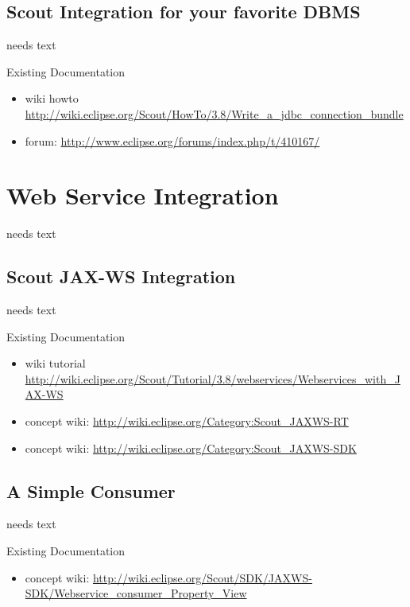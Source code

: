 \documentclass[a4paper,10pt,twoside]{book}
\begin{document}
\section{Scout Integration for your favorite DBMS}
needs text

\noindent Existing Documentation
\begin{itemize}
  \item wiki howto \url{http://wiki.eclipse.org/Scout/HowTo/3.8/Write_a_jdbc_connection_bundle}
  \item forum: \url{http://www.eclipse.org/forums/index.php/t/410167/}
\end{itemize}

\chapter{Web Service Integration}
needs text

\section{Scout JAX-WS Integration}
needs text

\noindent Existing Documentation
\begin{itemize}
  \item wiki tutorial \url{http://wiki.eclipse.org/Scout/Tutorial/3.8/webservices/Webservices_with_JAX-WS}
  \item concept wiki: \url{http://wiki.eclipse.org/Category:Scout_JAXWS-RT}
  \item concept wiki: \url{http://wiki.eclipse.org/Category:Scout_JAXWS-SDK}
\end{itemize}

\section{A Simple Consumer}
needs text

\noindent Existing Documentation
\begin{itemize}
  \item concept wiki: \url{http://wiki.eclipse.org/Scout/SDK/JAXWS-SDK/Webservice_consumer_Property_View}
\end{itemize}
\end{document}
